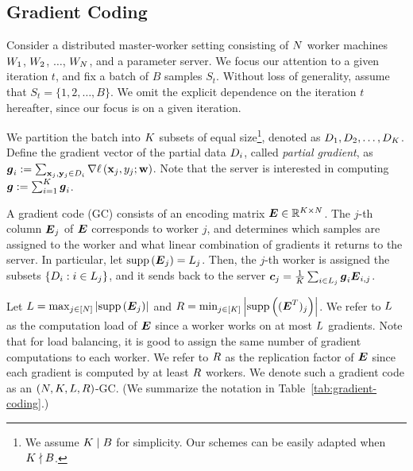 \documentclass[conference,letterpaper]{IEEEtran}
\begin{document}

\subsection{Gradient Coding}
\label{sec:grad-coding}
Consider a distributed master-worker setting consisting of $N$ worker machines $W_{1}$, $W_{2}$, $\ldots$, $W_{N}$, and a parameter server. 
 We focus our attention to a given iteration $t$, and fix a batch of $B$ samples $S_t$. Without loss of generality, assume that $S_t = \{1,2,\ldots,B\}$. We omit the explicit dependence on the iteration $t$ hereafter, since our focus is on a given iteration. 
 
We partition the batch into $K$ subsets of equal size\footnote{We assume $K\mid B$ for simplicity. Our schemes can be easily adapted when $K \nmid B$.}, denoted as $D_{1},D_{2},\ldots,D_{K}$. Define the gradient vector of the partial data $D_{i}$, called {\it partial gradient}, as $\boldsymbol{g}_{i} := \sum_{\mathbf{x}_j,\mathbf{y}_j\in D_{i}} \nabla \ell\left(\mathbf{x}_{j},y_{j};\mathbf{w}\right)$. Note that the server is interested in computing $\boldsymbol{g} := \sum_{i=1}^{K}\boldsymbol{g}_{i}$. 

A gradient code (GC) consists of an encoding matrix $\boldsymbol{E}\in\mathbb{R}^{K\times N}$. %
The $j$-th column $\boldsymbol{E}_j$ of $\boldsymbol{E}$ corresponds to worker $j$, and determines which samples are assigned to the worker and what linear combination of gradients it returns to the server. In particular, let $\mathrm{supp}\left(\boldsymbol{E}_j\right) = L_j$. Then, the $j$-th worker is assigned the subsets $\{D_{i} : i\in L_j\}$, and it sends back to the server $\boldsymbol{c}_j = \frac{1}{K}\sum_{i\in L_j} \boldsymbol{g}_{i}\boldsymbol{E}_{i,j}$. 

Let $L = \max_{j\in[N]}\left|\mathrm{supp}\left(\boldsymbol{E}_j\right)\right|$ and $R = \min_{j\in[K]}\left|\mathrm{supp}\left((\boldsymbol{E}^T)_j\right)\right|$. We refer to $L$ as the computation load of $\boldsymbol{E}$ since a worker works on at most $L$ gradients. Note that for load balancing, it is good to assign the same number of gradient computations to each worker. 
We refer to $R$ as the replication factor of $\boldsymbol{E}$ since each gradient is computed by at least $R$ workers. We denote such a gradient code as an $(N,K,L,R)$-GC. (We summarize the notation in Table~\ref{tab:gradient-coding}.) %
\end{document}

